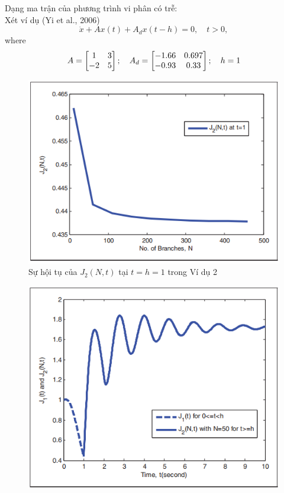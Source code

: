 \begin{vd}
	Dạng ma trận của phương trình vi phân có trễ: \\
	Xét ví dụ (Yi et al., 2006)
	\begin{equation}\label{45}
		\dot{x} + Ax(t) + A_dx(t-h) =0, \quad t >0 , 
	\end{equation}
where
  \[
  A= \begin{bmatrix} 1&3\\-2&5 \end{bmatrix};\quad A_d = \begin{bmatrix} -1.66&0.697\\ -0.93& 0.33 \end{bmatrix}; \quad h = 1
  \]
\begin{figure}[h!]
	\centering
	\includegraphics[scale= 0.7]{"./Hinh/Hinh16"}
	\caption[Sự hội tụ của $J_2(N,t)$ tại $t = h = 1$ trong Ví dụ 2 ]{Sự hội tụ của $J_2(N,t)$ tại $t = h = 1$ trong Ví dụ 2}
	\label{fig:hinh-16}
\end{figure}
\begin{figure}[h!]
	\centering
	\includegraphics[scale= 0.7]{"./Hinh/Hinh17"}

\end{figure}
\end{vd}
